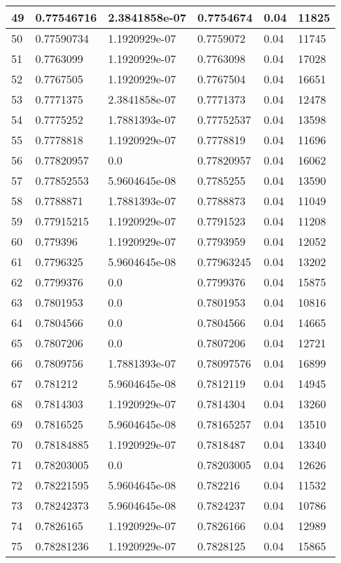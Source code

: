 \begin{longtable}{|l|l|l|l|l|l|}
49 & 0.77546716 & 2.3841858e-07 & 0.7754674 & 0.04 & 11825 \\ \hline 
50 & 0.77590734 & 1.1920929e-07 & 0.7759072 & 0.04 & 11745 \\ \hline 
51 & 0.7763099 & 1.1920929e-07 & 0.7763098 & 0.04 & 17028 \\ \hline 
52 & 0.7767505 & 1.1920929e-07 & 0.7767504 & 0.04 & 16651 \\ \hline 
53 & 0.7771375 & 2.3841858e-07 & 0.7771373 & 0.04 & 12478 \\ \hline 
54 & 0.7775252 & 1.7881393e-07 & 0.77752537 & 0.04 & 13598 \\ \hline 
55 & 0.7778818 & 1.1920929e-07 & 0.7778819 & 0.04 & 11696 \\ \hline 
56 & 0.77820957 & 0.0 & 0.77820957 & 0.04 & 16062 \\ \hline 
57 & 0.77852553 & 5.9604645e-08 & 0.7785255 & 0.04 & 13590 \\ \hline 
58 & 0.7788871 & 1.7881393e-07 & 0.7788873 & 0.04 & 11049 \\ \hline 
59 & 0.77915215 & 1.1920929e-07 & 0.7791523 & 0.04 & 11208 \\ \hline 
60 & 0.779396 & 1.1920929e-07 & 0.7793959 & 0.04 & 12052 \\ \hline 
61 & 0.7796325 & 5.9604645e-08 & 0.77963245 & 0.04 & 13202 \\ \hline 
62 & 0.7799376 & 0.0 & 0.7799376 & 0.04 & 15875 \\ \hline 
63 & 0.7801953 & 0.0 & 0.7801953 & 0.04 & 10816 \\ \hline 
64 & 0.7804566 & 0.0 & 0.7804566 & 0.04 & 14665 \\ \hline 
65 & 0.7807206 & 0.0 & 0.7807206 & 0.04 & 12721 \\ \hline 
66 & 0.7809756 & 1.7881393e-07 & 0.78097576 & 0.04 & 16899 \\ \hline 
67 & 0.781212 & 5.9604645e-08 & 0.7812119 & 0.04 & 14945 \\ \hline 
68 & 0.7814303 & 1.1920929e-07 & 0.7814304 & 0.04 & 13260 \\ \hline 
69 & 0.7816525 & 5.9604645e-08 & 0.78165257 & 0.04 & 13510 \\ \hline 
70 & 0.78184885 & 1.1920929e-07 & 0.7818487 & 0.04 & 13340 \\ \hline 
71 & 0.78203005 & 0.0 & 0.78203005 & 0.04 & 12626 \\ \hline 
72 & 0.78221595 & 5.9604645e-08 & 0.782216 & 0.04 & 11532 \\ \hline 
73 & 0.78242373 & 5.9604645e-08 & 0.7824237 & 0.04 & 10786 \\ \hline 
74 & 0.7826165 & 1.1920929e-07 & 0.7826166 & 0.04 & 12989 \\ \hline 
75 & 0.78281236 & 1.1920929e-07 & 0.7828125 & 0.04 & 15865 \\ \hline 
\end{longtable}